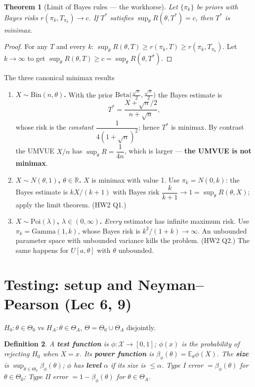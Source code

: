 \documentclass[11pt]{article}
\newtheorem{theorem}{Theorem}[section]
\newtheorem{definition}[theorem]{Definition}
\theoremstyle{remark}
\newcommand{\E}{\mathbb{E}}
\newcommand{\R}{\mathbb{R}}
\begin{document}
\begin{theorem}[Limit of Bayes rules --- the workhorse]
Let $\{\pi_k\}$ be priors with Bayes risks $r(\pi_k,T_{\pi_k})\to c$. If $T^*$ satisfies
$\sup_\theta R(\theta,T^*)=c$, then $T^*$ is minimax.
\end{theorem}
\begin{proof}
For any $T$ and every $k$:
$\sup_\theta R(\theta,T)\ge r(\pi_k,T)\ge r(\pi_k,T_{\pi_k})$. Let $k\to\infty$ to get
$\sup_\theta R(\theta,T)\ge c=\sup_\theta R(\theta,T^*)$.
\end{proof}

\begin{keybox}{The three canonical minimax results}
\begin{enumerate}
\item \textbf{$X\sim\mathrm{Bin}(n,\theta)$.} With the prior
$\mathrm{Beta}\big(\tfrac{\sqrt n}{2},\tfrac{\sqrt n}{2}\big)$ the Bayes estimate is
\[
T^*=\frac{X+\sqrt n/2}{n+\sqrt n},
\]
whose risk is the \emph{constant} $\dfrac{1}{4(1+\sqrt n)^2}$; hence $T^*$ is minimax. By
contrast the UMVUE $X/n$ has $\sup_\theta R=\dfrac{1}{4n}$, which is larger --- \textbf{the
UMVUE is not minimax}.
\item \textbf{$X\sim N(\theta,1)$, $\theta\in\R$.} $X$ is minimax with value 1. Use
$\pi_k=N(0,k)$: the Bayes estimate is $kX/(k+1)$ with Bayes risk
$\dfrac{k}{k+1}\to1=\sup_\theta R(\theta,X)$; apply the limit theorem. (HW2 Q1.)
\item \textbf{$X\sim\mathrm{Poi}(\lambda)$, $\lambda\in(0,\infty)$.} \emph{Every} estimator has
infinite maximum risk. Use $\pi_k=\mathrm{Gamma}(1,k)$, whose Bayes risk is
$k^2/(1+k)\to\infty$. An unbounded parameter space with unbounded variance kills the
problem. (HW2 Q2.) The same happens for $U[a,\theta]$ with $\theta$ unbounded.
\end{enumerate}
\end{keybox}

\section{Testing: setup and Neyman--Pearson (Lec 6, 9)}

$H_0:\theta\in\Theta_0$ vs $H_A:\theta\in\Theta_A$, $\Theta=\Theta_0\cup\Theta_A$ disjointly.

\begin{definition}
A \textbf{test function} is $\phi:\mathcal{X}\to[0,1]$; $\phi(x)$ is the probability of
rejecting $H_0$ when $X=x$. Its \textbf{power function} is $\beta_\phi(\theta)=\E_\theta\phi(X)$.
The \textbf{size} is $\sup_{\theta\in\Theta_0}\beta_\phi(\theta)$; $\phi$ has \textbf{level}
$\alpha$ if its size is $\le\alpha$. Type I error $=\beta_\phi(\theta)$ for $\theta\in\Theta_0$;
Type II error $=1-\beta_\phi(\theta)$ for $\theta\in\Theta_A$.
\end{definition}
\end{document}

